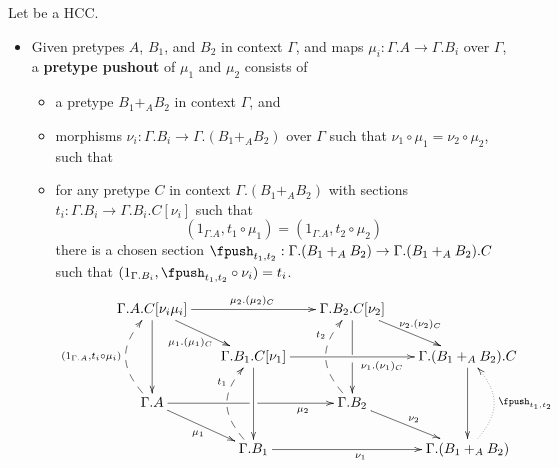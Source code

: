 \documentclass{amsart}
\begin{document}
\begin{defn}
  Let \E be a HCC.
  \begin{itemize}
  \item Given pretypes $A$, $B_1$, and $B_2$ in context $\Gamma$, and maps $\mu_i :\Gamma.A\to \Gamma.B_i$ over $\Gamma$, a \textbf{pretype pushout} of $\mu_1$ and $\mu_2$ consists of
    \begin{itemize}
    \item a pretype $B_1 +_A B_2$ in context $\Gamma$, and
    \item morphisms $\nu_i : \Gamma.B_i \to \Gamma.(B_1+_A B_2)$ over $\Gamma$ such that $\nu_1 \circ \mu_1 = \nu_2 \circ \mu_2$, such that
    \item for any pretype $C$ in context $\Gamma.(B_1 +_A B_2)$ with sections $t_i : \Gamma.B_i \to \Gamma.B_i.C[\nu_i]$ such that
      \[ (1_{\Gamma.A}, t_1\circ \mu_1) = (1_{\Gamma.A}, t_2\circ \mu_2) \]
      there is a chosen section $\fpush_{t_1,t_2}:\Gamma.(B_1 +_A B_2) \to \Gamma.(B_1 +_A B_2).C$ such that
      $(1_{\Gamma.B_i} , \fpush_{t_1,t_2} \circ \nu_i) = t_i$.
      \[ \xymatrix@-.5pc{
        \Gamma.A.C[\nu_i\mu_i] \ar[rr]^{\mu_2.(\mu_2)_C} \ar[dd] \ar[dr]_{\mu_1.(\mu_1)_C}  &&
        \Gamma.B_2.C[\nu_2] \ar'[d][dd] \ar[dr]^{\nu_2.(\nu_2)_C}\\
        & \Gamma.B_1.C[\nu_1] \ar[dd] \ar[rr]_(.6){\nu_1.(\nu_1)_C} &&
        \Gamma.(B_1+_A B_2).C\ar[dd]\\
        \Gamma.A \ar[dr]_{\mu_1} \ar'[r][rr]_{\mu_2} \ar@{-->}@(ul,dl)[uu]^{(1_{\Gamma.A}, t_i\circ \mu_i)} & &
        \Gamma.B_2 \ar[dr]^{\nu_2} \ar@{-->}@(ul,dl)[uu]^(.7){t_2}\\
        & \Gamma.B_1 \ar[rr]_{\nu_1} \ar@{-->}@(ul,dl)[uu]^(.7){t_1} &&
        \Gamma.(B_1+_A B_2) \ar@{.>}@(ur,dr)[uu]_{\fpush_{t_1,t_2}}
      }\]


\end{itemize}
\end{itemize}
\end{defn}
\end{document}
